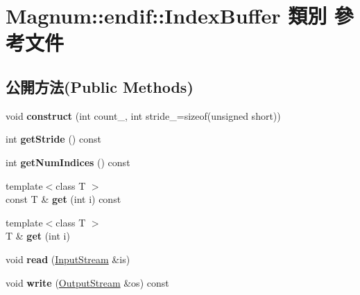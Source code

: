 \hypertarget{class_magnum_1_1endif_1_1_index_buffer}{}\section{Magnum\+:\+:endif\+:\+:Index\+Buffer 類別 參考文件}
\label{class_magnum_1_1endif_1_1_index_buffer}
\subsection*{公開方法(Public Methods)}
\begin{DoxyCompactItemize}
\item 
void {\bfseries construct} (int count\+\_\+, int stride\+\_\+=sizeof(unsigned short))\hypertarget{class_magnum_1_1endif_1_1_index_buffer_ac2a2d8f67e72f3a901987e5204141c21}{}\label{class_magnum_1_1endif_1_1_index_buffer_ac2a2d8f67e72f3a901987e5204141c21}

\item 
int {\bfseries get\+Stride} () const \hypertarget{class_magnum_1_1endif_1_1_index_buffer_ade573f2c88d52379c0ed48899bcb7562}{}\label{class_magnum_1_1endif_1_1_index_buffer_ade573f2c88d52379c0ed48899bcb7562}

\item 
int {\bfseries get\+Num\+Indices} () const \hypertarget{class_magnum_1_1endif_1_1_index_buffer_a90c44088c590196396d4f68612199849}{}\label{class_magnum_1_1endif_1_1_index_buffer_a90c44088c590196396d4f68612199849}

\item 
{\footnotesize template$<$class T $>$ }\\const T \& {\bfseries get} (int i) const \hypertarget{class_magnum_1_1endif_1_1_index_buffer_a7ca3bf6be2d9adf913ff8dc08fac1cda}{}\label{class_magnum_1_1endif_1_1_index_buffer_a7ca3bf6be2d9adf913ff8dc08fac1cda}

\item 
{\footnotesize template$<$class T $>$ }\\T \& {\bfseries get} (int i)\hypertarget{class_magnum_1_1endif_1_1_index_buffer_a271ed45cc566f8fb584474161b940fec}{}\label{class_magnum_1_1endif_1_1_index_buffer_a271ed45cc566f8fb584474161b940fec}

\item 
void {\bfseries read} (\hyperlink{class_magnum_1_1_input_stream}{Input\+Stream} \&is)\hypertarget{class_magnum_1_1endif_1_1_index_buffer_a7e204dfa222612798a880e27f5216e33}{}\label{class_magnum_1_1endif_1_1_index_buffer_a7e204dfa222612798a880e27f5216e33}

\item 
void {\bfseries write} (\hyperlink{class_magnum_1_1_output_stream}{Output\+Stream} \&os) const \hypertarget{class_magnum_1_1endif_1_1_index_buffer_af7af6ced976c02c839d84dd6067152e3}{}\label{class_magnum_1_1endif_1_1_index_buffer_af7af6ced976c02c839d84dd6067152e3}

\end{DoxyCompactItemize}
